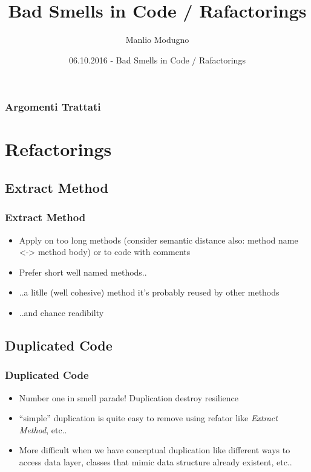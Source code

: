 \documentclass{beamer}
\title{Bad Smells in Code / Rafactorings}
\author{Manlio Modugno}
\institute[GMTechnologies]
\date[06.10.2016] 
{06.10.2016 - Bad Smells in Code / Rafactorings}
\begin{document}
\begin{frame}
  \titlepage
\end{frame}

\begin{frame}
  \frametitle{Argomenti Trattati}
  \tableofcontents
\end{frame}

\section{Refactorings}
\subsection{Extract Method}
\begin{frame}
  \frametitle{Extract Method}
  \begin{itemize}
	\item<+-> Apply on too long methods (consider semantic distance also: method name <-> method body) or to code with comments
	\item<+-> Prefer short well named methods..
	\item<+-> ..a litlle (well cohesive) method it's probably reused by other methods
    \item<+-> ..and ehance readibilty
  \end{itemize}
\end{frame}

\subsection{Duplicated Code}
\begin{frame}
  \frametitle{Duplicated Code}
  \begin{itemize}
	\item<+-> Number one in smell parade! Duplication destroy resilience
	\item<+-> ``simple'' duplication is quite easy to remove using refator like \textit{Extract Method}, etc..
	\item<+-> More difficult when we have conceptual duplication like different ways to access data layer, classes that mimic data structure already existent, etc..
  \end{itemize}
\end{frame}
\end{document}
